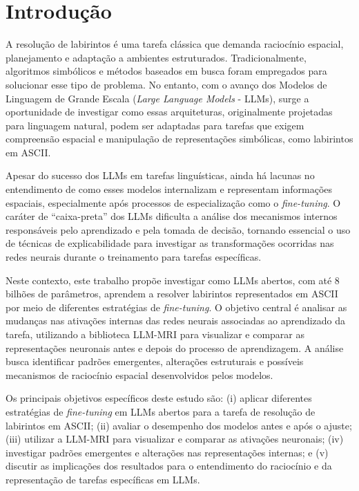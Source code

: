 \section{Introdução}\label{sec:introducao}

A resolução de labirintos é uma tarefa clássica que demanda raciocínio espacial, planejamento e adaptação a ambientes estruturados. Tradicionalmente, algoritmos simbólicos e métodos baseados em busca foram empregados para solucionar esse tipo de problema. No entanto, com o avanço dos Modelos de Linguagem de Grande Escala (\textit{Large Language Models} - LLMs), surge a oportunidade de investigar como essas arquiteturas, originalmente projetadas para linguagem natural, podem ser adaptadas para tarefas que exigem compreensão espacial e manipulação de representações simbólicas, como labirintos em ASCII.

Apesar do sucesso dos LLMs em tarefas linguísticas, ainda há lacunas no entendimento de como esses modelos internalizam e representam informações espaciais, especialmente após processos de especialização como o \textit{fine-tuning}. O caráter de ``caixa-preta'' dos LLMs dificulta a análise dos mecanismos internos responsáveis pelo aprendizado e pela tomada de decisão, tornando essencial o uso de técnicas de explicabilidade para investigar as transformações ocorridas nas redes neurais durante o treinamento para tarefas específicas.

Neste contexto, este trabalho propõe investigar como LLMs abertos, com até 8 bilhões de parâmetros, aprendem a resolver labirintos representados em ASCII por meio de diferentes estratégias de \textit{fine-tuning}. O objetivo central é analisar as mudanças nas ativações internas das redes neurais associadas ao aprendizado da tarefa, utilizando a biblioteca LLM-MRI \cite{costa2024llmmri} para visualizar e comparar as representações neuronais antes e depois do processo de aprendizagem. A análise busca identificar padrões emergentes, alterações estruturais e possíveis mecanismos de raciocínio espacial desenvolvidos pelos modelos.

Os principais objetivos específicos deste estudo são: (i) aplicar diferentes estratégias de \textit{fine-tuning} em LLMs abertos para a tarefa de resolução de labirintos em ASCII; (ii) avaliar o desempenho dos modelos antes e após o ajuste; (iii) utilizar a LLM-MRI para visualizar e comparar as ativações neuronais; (iv) investigar padrões emergentes e alterações nas representações internas; e (v) discutir as implicações dos resultados para o entendimento do raciocínio e da representação de tarefas específicas em LLMs.

